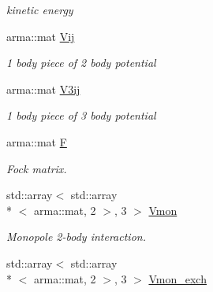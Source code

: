 \begin{DoxyCompactItemize}
\begin{DoxyCompactList}\small\item\em kinetic energy \end{DoxyCompactList}\item 
\hypertarget{classHartreeFock_ae823da58505b21231d092b3ef7cec3bf}{arma\-::mat \hyperlink{classHartreeFock_ae823da58505b21231d092b3ef7cec3bf}{Vij}}\label{classHartreeFock_ae823da58505b21231d092b3ef7cec3bf}

\begin{DoxyCompactList}\small\item\em 1 body piece of 2 body potential \end{DoxyCompactList}\item 
\hypertarget{classHartreeFock_a25a0f38a655064375765f74182ce9334}{arma\-::mat \hyperlink{classHartreeFock_a25a0f38a655064375765f74182ce9334}{V3ij}}\label{classHartreeFock_a25a0f38a655064375765f74182ce9334}

\begin{DoxyCompactList}\small\item\em 1 body piece of 3 body potential \end{DoxyCompactList}\item 
\hypertarget{classHartreeFock_a45136295f4834a9f692f262eee75672a}{arma\-::mat \hyperlink{classHartreeFock_a45136295f4834a9f692f262eee75672a}{F}}\label{classHartreeFock_a45136295f4834a9f692f262eee75672a}

\begin{DoxyCompactList}\small\item\em Fock matrix. \end{DoxyCompactList}\item 
\hypertarget{classHartreeFock_aa007e1dc1d1fc8f4a24b42fc82ff277b}{std\-::array$<$ std\-::array\\*
$<$ arma\-::mat, 2 $>$, 3 $>$ \hyperlink{classHartreeFock_aa007e1dc1d1fc8f4a24b42fc82ff277b}{Vmon}}\label{classHartreeFock_aa007e1dc1d1fc8f4a24b42fc82ff277b}

\begin{DoxyCompactList}\small\item\em Monopole 2-\/body interaction. \end{DoxyCompactList}\item 
\hypertarget{classHartreeFock_a5ddc7c175c587f4cbf8a64b36c07e57d}{std\-::array$<$ std\-::array\\*
$<$ arma\-::mat, 2 $>$, 3 $>$ \hyperlink{classHartreeFock_a5ddc7c175c587f4cbf8a64b36c07e57d}{Vmon\-\_\-exch}}\label{classHartreeFock_a5ddc7c175c587f4cbf8a64b36c07e57d}


\end{DoxyCompactItemize}
